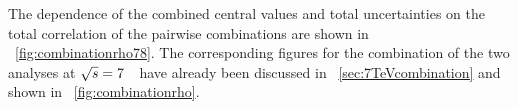 %
%
The dependence of the combined central values and total uncertainties on the total correlation of the pairwise combinations are shown in \fig~\ref{fig:combinationrho78}. The corresponding figures for the combination of the two analyses at ${\sqrt{s}}=7$~\TeV\ have already been discussed in \sect~\ref{sec:7TeVcombination} and shown in \fig~\ref{fig:combinationrho}. 
%
%
\begin{figure}[tbp!]
\centering
{}
\hfill
{}
\end{figure}
